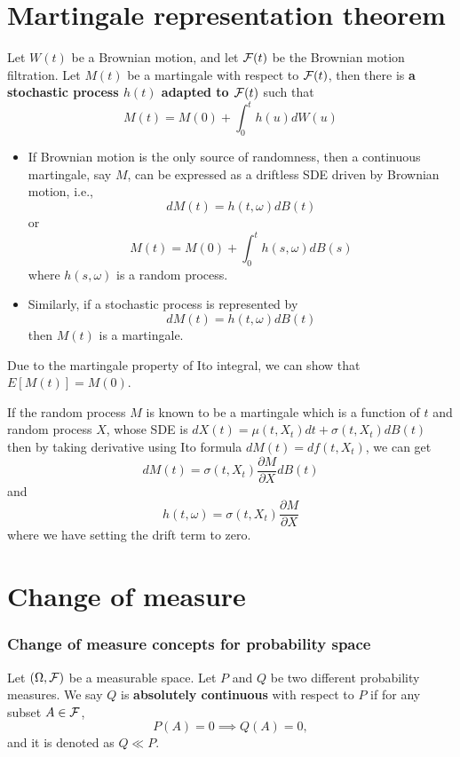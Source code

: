 \begin{refsection}
\section{Martingale representation theorem}
\begin{theorem}
	\cite[221]{shreve2004stochastic2}Let $W(t)$ be a Brownian motion, and let $\mathcal{F}(t)$ be the Brownian motion filtration. Let $M(t)$ be a martingale with respect to $\mathcal{F}(t)$, then there is \textbf{a stochastic process $h(t)$ adapted to $\mathcal{F}(t)$} such that
	$$M(t) = M(0) + \int_0^t h(u)dW(u)$$
\end{theorem}

\begin{remark}[interpretation]\hfill
	\begin{itemize}
		\item If Brownian motion is the only source of randomness, then a continuous martingale, say $M$, can be expressed as a driftless SDE driven by Brownian motion, i.e., $$dM(t) = h(t,\omega)dB(t)$$
		or
		$$M(t) = M(0) + \int_0^t h(s,\omega)dB(s)$$
		where $h(s,\omega)$ is a random process.
		\item Similarly, if a stochastic process is represented by 
		$$dM(t) = h(t,\omega)dB(t)$$
		then $M(t)$ is a martingale.
	\end{itemize}
\end{remark}


\begin{remark}
	Due to the martingale property of Ito integral, we can show that $E[M(t)] = M(0)$.
\end{remark}

\begin{example}
	If the random process $M$ is known to be a martingale which is a function of $t$ and random process $X$, whose SDE is $dX(t)=\mu(t,X_t)dt + \sigma(t,X_t)dB(t)$
	then by taking derivative using Ito formula $dM(t) = df(t,X_t)$, we can get $$dM(t) = \sigma(t,X_t)\frac{\partial M}{\partial X}dB(t)$$
	and $$h(t,\omega) = \sigma(t,X_t)\frac{\partial M}{\partial X}$$
	where we have setting the drift term to zero.
\end{example}



\section{Change of measure}

\subsubsection{Change of measure concepts for probability space}
\begin{definition} \cite[34]{wu2009interest}
	Let $(\Omega,\mathcal{F})$ be a measurable space. Let $P$ and $Q$ be two different probability measures. We say $Q$ is \textbf{absolutely continuous} with respect to $P$ if for any subset $A\in\mathcal{F}$, 
	$$P(A) = 0 \implies Q(A) = 0,$$
	and it is denoted as $Q\ll P$.
\end{definition}


\end{refsection}
